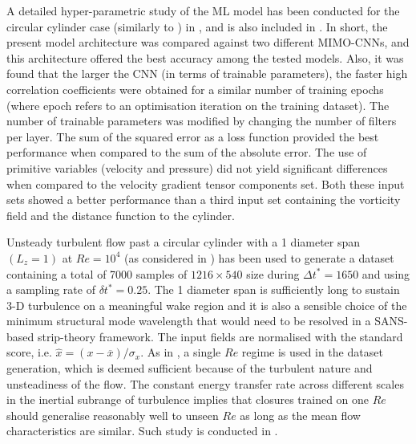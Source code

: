 \documentclass[../main.tex]{subfiles}
\begin{document}
A detailed hyper-parametric study of the ML model has been conducted for the circular cylinder case (similarly to ) in \cite{Font2020a}, and is also included in .
In short, the present model architecture was compared against two different MIMO-CNNs, and this architecture offered the best accuracy among the tested models.
Also, it was found that the larger the CNN (in terms of trainable parameters), the faster high correlation coefficients were obtained for a similar number of training epochs (where epoch refers to an optimisation iteration on the training dataset).
The number of trainable parameters was modified by changing the number of filters per layer.
The sum of the squared error as a loss function provided the best performance when compared to the sum of the absolute error.
The use of primitive variables (velocity and pressure) did not yield significant differences when compared to the velocity gradient tensor components set. 
Both these input sets showed a better performance than a third input set containing the vorticity field and the distance function to the cylinder.

Unsteady turbulent flow past a circular cylinder with a 1 diameter span $(L_z=1)$ at $Re=10^4$ (as considered in ) has been used to generate a dataset containing a total of 7000 samples of $1216\times540$ size during $\Delta t^*=1650$ and using a sampling rate of $\delta t^*=0.25$.
The 1 diameter span is sufficiently long to sustain 3-D turbulence on a meaningful wake region and it is also a sensible choice of the minimum structural mode wavelength that would need to be resolved in a SANS-based strip-theory framework.
The input fields are normalised with the standard score, i.e. $\hat{x} = (x-\overline{x})/\sigma_x$.
As in \cite{Beck2019, Kim2020a}, a single $Re$ regime is used in the dataset generation, which is deemed sufficient because of the turbulent nature and unsteadiness of the flow.
The constant energy transfer rate across different scales in the inertial subrange of turbulence implies that closures trained on one $Re$ should generalise reasonably well to unseen $Re$ as long as the mean flow characteristics are similar.
Such study is conducted in .
\end{document}
